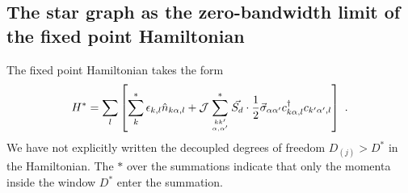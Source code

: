 \documentclass[reprint,prb,superscriptaddress]{revtex4-2}
\begin{document}
\subsection{The star graph as the zero-bandwidth limit of the fixed point Hamiltonian}
\label{sec:star graph}
The fixed point Hamiltonian takes the form
\begin{equation}\begin{aligned}
	H^* = \sum_l\left[ \sum^*_{k}\epsilon_{k,l} \hat n_{k\alpha,l} + {\mathcal{J}}\sum_{kk^\prime\atop{\alpha,\alpha^\prime}}^* \vec{S_d}\cdot\frac{1}{2}\vec{\sigma}_{\alpha\alpha^\prime}c_{k\alpha,l}^\dagger c_{k^\prime\alpha^\prime, l}\right]~.
\end{aligned}\end{equation}
We have not explicitly written the decoupled degrees of freedom \(D_{(j)} > D^*\) in the Hamiltonian. The \(*\) over the summations indicate that only the momenta inside the window \(D^*\) enter the summation.
\end{document}
